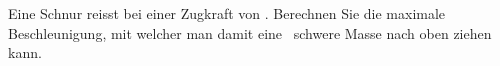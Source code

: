 Eine Schnur reisst bei einer Zugkraft von \FSnO. Berechnen Sie die maximale Beschleunigung, mit welcher man damit eine \mSnO\ schwere Masse nach oben ziehen kann.

